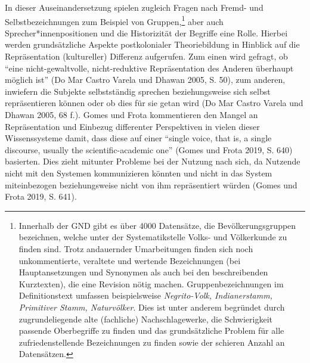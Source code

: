 \documentclass[a4paper,
fontsize=11pt,
oneside,
numbers=noperiodatend,
parskip=half-,
bibliography=totoc,
final
]{scrartcl}
\begin{document}
In dieser Auseinandersetzung spielen zugleich Fragen nach Fremd- und
Selbstbezeichnungen zum Beispiel von Gruppen,\footnote{Innerhalb der GND
  gibt es über 4000 Datensätze, die Bevölkerungsgruppen bezeichnen,
  welche unter der Systematikstelle Volks- und Völkerkunde zu finden
  sind. Trotz andauernder Umarbeitungen finden sich noch unkommentierte,
  veraltete und wertende Bezeichnungen (bei Hauptansetzungen und
  Synonymen als auch bei den beschreibenden Kurztexten), die eine
  Revision nötig machen. Gruppenbezeichnungen im Definitionstext
  umfassen beispielsweise \emph{Negrito-Volk, Indianerstamm, Primitiver
  Stamm, Naturvölker}. Dies ist unter anderem begründet durch
  zugrundeliegende alte (fachliche) Nachschlagewerke, die Schwierigkeit
  passende Oberbegriffe zu finden und das grundsätzliche Problem für
  alle zufriedenstellende Bezeichnungen zu finden sowie der schieren
  Anzahl an Datensätzen.} aber auch Sprecher*innenpositionen und die
Historizität der Begriffe eine Rolle. Hierbei werden grundsätzliche
Aspekte postkolonialer Theoriebildung in Hinblick auf die Repräsentation
(kultureller) Differenz aufgerufen. Zum einen wird gefragt, ob
\enquote{eine nicht-gewaltvolle, nicht-reduktive Repräsentation des
Anderen überhaupt möglich ist} (Do Mar Castro Varela und Dhawan 2005, S.
50), zum anderen, inwiefern die Subjekte selbstständig sprechen
beziehungsweise sich selbst repräsentieren können oder ob dies für sie
getan wird (Do Mar Castro Varela und Dhawan 2005, 68 f.). Gomes und
Frota kommentieren den Mangel an Repräsentation und Einbezug differenter
Perspektiven in vielen dieser Wissenssysteme damit, dass diese auf einer
\enquote{single voice, that is, a single discourse, usually the
scientific-academic one} (Gomes und Frota 2019, S. 640) basierten. Dies
zieht mitunter Probleme bei der Nutzung nach sich, da Nutzende nicht mit
den Systemen kommunizieren könnten und nicht in das System miteinbezogen
beziehungsweise nicht von ihm repräsentiert würden (Gomes und Frota
2019, S. 641).
\end{document}
